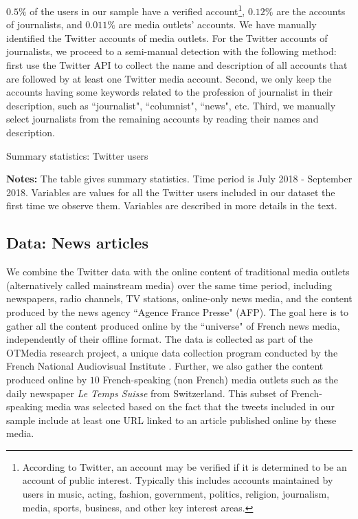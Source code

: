 $0.5\%$ of the users in our sample have a verified account\footnote{According to Twitter, an account may be verified if it is determined to be an account of public interest. Typically this includes accounts maintained by users in music, acting, fashion, government, politics, religion, journalism, media, sports, business, and other key interest areas.}, $0.12\%$ are the accounts of journalists, and $0.011\%$ are media outlets' accounts. We have manually identified the Twitter accounts of media outlets. For the Twitter accounts of journalists, we proceed to a semi-manual detection with the following method: first use the Twitter API to collect the name and description of all accounts that are followed by at least one Twitter media account. Second, we only keep the accounts having some keywords related to the profession of journalist in their description, such as ``journalist", ``columnist", ``news", etc. Third, we manually select journalists from the remaining accounts by reading their names and description.



\begin{table}
\caption{Summary statistics: Twitter users}
\begin{center}
	
\end{center}
\begin{spacing}{0.5}
	{\fns \textbf{Notes:} The table gives summary statistics. Time period is July 2018 - September 2018. Variables are values for all the Twitter users included in our dataset the first time we observe them. Variables are described in more details in the text.} 
\end{spacing}
\label{Tab:table_summary_users_all_first}
\end{table} 



\subsection{Data: News articles\label{Sec:DataNews}}

We combine the Twitter data with the online content of traditional media outlets (alternatively called mainstream media) over the same time period, including newspapers, radio channels, TV stations, online-only news media, and the content produced by the news agency ``Agence France Presse" (AFP). The goal here is to gather all the content produced online by the ``universe" of French news media, independently of their offline format. The data is collected as part of the OTMedia research project, a unique data collection program conducted by the French National Audiovisual Institute \citep{CageHerveViaud2020}. Further, we also gather the content produced online by $10$ French-speaking (non French) media outlets such as the daily newspaper \textit{Le Temps Suisse} from Switzerland. This subset of French-speaking media was selected based on the fact that the tweets included in our sample include at least one URL linked to an article published online by these media.


